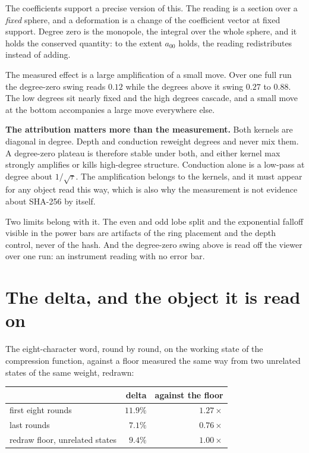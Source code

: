 The coefficients support a precise version of this. The reading is a section over a \emph{fixed} sphere, and a deformation is a change of the coefficient vector at fixed support. Degree zero is the monopole, the integral over the whole sphere, and it holds the conserved quantity: to the extent \(a_{00}\) holds, the reading redistributes instead of adding.

The measured effect is a large amplification of a small move. Over one full run the degree-zero swing reads \(0.12\) while the degrees above it swing \(0.27\) to \(0.88\). The low degrees sit nearly fixed and the high degrees cascade, and a small move at the bottom accompanies a large move everywhere else.

\textbf{The attribution matters more than the measurement.} Both kernels are diagonal in degree. Depth and conduction reweight degrees and never mix them. A degree-zero plateau is therefore stable under both, and either kernel max strongly amplifies or kills high-degree structure. Conduction alone is a low-pass at degree about \(1/\sqrt{\tau}\). The amplification belongs to the kernels, and it must appear for any object read this way, which is also why the measurement is not evidence about SHA-256 by itself.

Two limits belong with it. The even and odd lobe split and the exponential falloff visible in the power bars are artifacts of the ring placement and the depth control, never of the hash. And the degree-zero swing above is read off the viewer over one run: an instrument reading with no error bar.

\section{The delta, and the object it is read on}

The eight-character word, round by round, on the working state of the compression function, against a floor measured the same way from two unrelated states of the same weight, redrawn:

\begin{center}
\begin{tabular}{lrr}
\toprule
 & delta & against the floor \\
\midrule
first eight rounds & \(11.9\%\) & \(1.27\times\) \\
last rounds & \(7.1\%\) & \(0.76\times\) \\
redraw floor, unrelated states & \(9.4\%\) & \(1.00\times\) \\
\bottomrule
\end{tabular}
\end{center}


